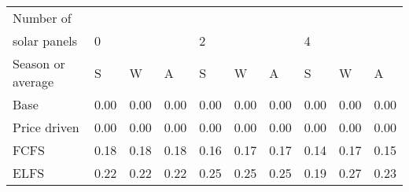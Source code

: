 \begin{table}[h] 
\centering 
\begin{tabular}{l|lll|lll|lll}Number of \\ solar panels&0& & &2& & &4& & \\ \hline 
Season or average & S & W & A & S & W & A & S & W & A \\ \hline 
Base&0.00&0.00&0.00&0.00&0.00&0.00&0.00&0.00&0.00 \\ 
Price driven&0.00&0.00&0.00&0.00&0.00&0.00&0.00&0.00&0.00 \\ 
FCFS&0.18&0.18&0.18&0.16&0.17&0.17&0.14&0.17&0.15 \\ 
ELFS&0.22&0.22&0.22&0.25&0.25&0.25&0.19&0.27&0.23 \\ 
\end{tabular} 
\end{table}
